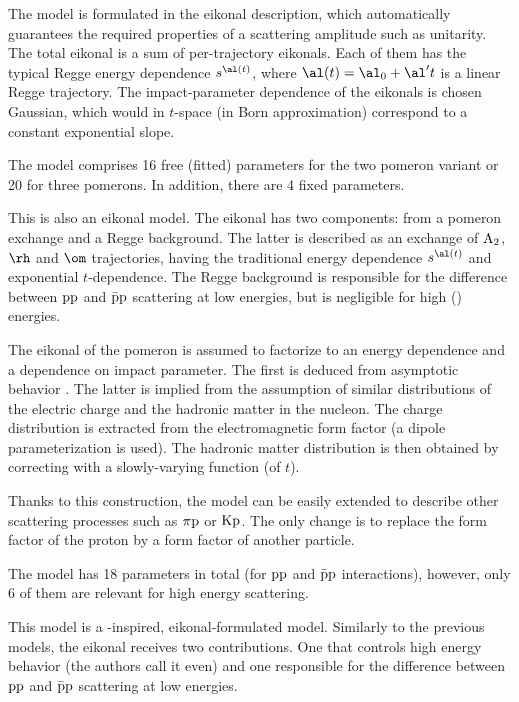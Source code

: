 The model is formulated in the eikonal description, which automatically guarantees the required properties of a scattering amplitude such as unitarity. The total eikonal is a sum of per-trajectory eikonals. Each of them has the typical Regge energy dependence $s^{\al(t)}$, where $\al(t) = \al_0 + \al' t$ is a linear Regge trajectory. The impact-parameter dependence of the eikonals is chosen Gaussian, which would in $t$-space (in Born approximation) correspond to a constant exponential slope.

The model comprises 16 free (fitted) parameters for the two pomeron variant or 20 for three pomerons. In addition, there are 4 fixed parameters.

\def\OutlineLabel{The model of Bourrely et al.}

This is also an eikonal model. The eikonal has two components: from a pomeron exchange and a Regge background. The latter is described as an exchange of $\rm A_2$, $\rm \rh$ and $\rm \om$ trajectories, having the traditional energy dependence $s^{\al(t)}$ and exponential $t$-dependence. The Regge background is responsible for the difference between $\rm pp$ and $\rm\bar pp$ scattering at low energies, but is negligible for high () energies.

The eikonal of the pomeron is assumed to factorize to an energy dependence and a dependence on impact parameter. The first is deduced from asymptotic  behavior . The latter is implied from the assumption of similar distributions of the electric charge and the hadronic matter in the nucleon. The charge distribution is extracted from the electromagnetic form factor (a dipole parameterization is used). The hadronic matter distribution is then obtained by correcting with a slowly-varying function (of $t$).

Thanks to this construction, the model can be easily extended to describe other scattering processes such as $\rm \pi p$ or $\rm Kp$. The only change is to replace the form factor of the proton by a form factor of another particle.

The model has 18 parameters in total (for $\rm pp$ and $\rm \bar p p$ interactions), however, only 6 of them are relevant for high energy scattering.

\def\OutlineLabel{The model of Block et al.}

This model is a -inspired, eikonal-formulated model. Similarly to the previous models, the eikonal receives two contributions. One that controls high energy behavior (the authors call it even) and one responsible for the difference between $\rm pp$ and $\rm\bar pp$ scattering at low energies.

